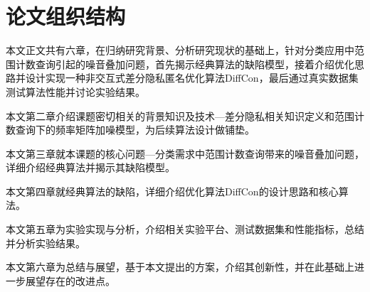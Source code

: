 \section{论文组织结构}

本文正文共有六章，在归纳研究背景、分析研究现状的基础上，针对分类应用中范围计数查询引起的噪音叠加问题，首先揭示经典算法的缺陷模型，接着介绍优化思路并设计实现一种非交互式差分隐私匿名优化算法DiffCon，最后通过真实数据集测试算法性能并讨论实验结果。

本文第二章介绍课题密切相关的背景知识及技术---差分隐私相关知识定义和范围计数查询下的频率矩阵加噪模型，为后续算法设计做铺垫。

本文第三章就本课题的核心问题---分类需求中范围计数查询带来的噪音叠加问题，详细介绍经典算法并揭示其缺陷模型。

本文第四章就经典算法的缺陷，详细介绍优化算法DiffCon的设计思路和核心算法。

本文第五章为实验实现与分析，介绍相关实验平台、测试数据集和性能指标，总结并分析实验结果。

本文第六章为总结与展望，基于本文提出的方案，介绍其创新性，并在此基础上进一步展望存在的改进点。
